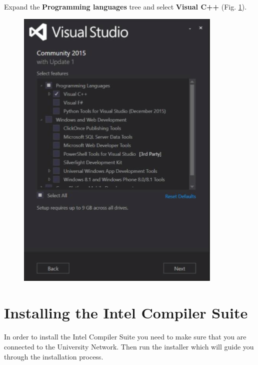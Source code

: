 \documentclass[10pt,a4paper,oneside]{article}
\begin{document}
Expand the \textbf{Programming languages} tree and select \textbf{Visual C++} (Fig. \ref{fig:VS2}).
\begin{figure}[ht]
\centering
\includegraphics[scale=0.55]{VS2.png}
\caption{}
\label{fig:VS2}
\end{figure}

\section*{Installing the Intel Compiler Suite}
In order to install the Intel Compiler Suite you need to make sure that you are connected to the University Network. Then run the installer which will guide you through the installation process. 
\end{document}
